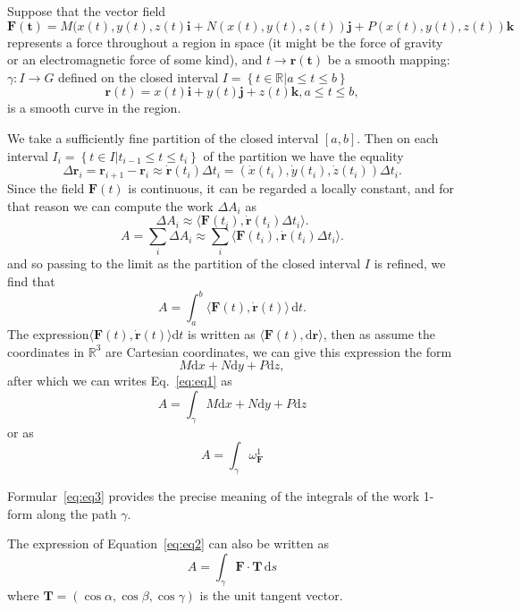 \documentclass[a4paper,12pt]{article}
\begin{document}
\begin{CJK}{UTF8}{gbsn}
Suppose that the vector field 
\[
    \bm{F(t)} = M(x(t),y(t),z(t)\bm{i} + 
N(x(t),y(t),z(t))\bm{j} + P(x(t),y(t),z(t))\bm{k}
\]
represents a force throughout a region in space (it might be the force of 
gravity or an electromagnetic force of some kind), and $t \to \bm{r(t)}$ 
be a smooth mapping: $\gamma: I \to G$ defined on the closed interval 
$I = \left\{t \in \mathbb{R} | a \le t \le b\right\}$
\[
    \bm{r}(t) = x(t)\bm{i} + y(t)\bm{j} + z(t)\bm{k},
    a \le t \le b,
\]
is a smooth curve in the region.

We take a sufficiently fine partition of the closed interval $\left[a,b\right]$.
Then on each interval $\displaystyle I_i = \left\{t \in I | t_{i-1}\le t \le t_i \right\}$
of the partition we have the equality 
\[
    \Delta \bm{r}_i = \bm{r}_{i+1} - \bm{r}_i \approx 
    \dot{\bm{r}}(t_i)\Delta t_i = \left(\dot{x}(t_i),\dot{y}(t_i),\dot{z}(t_i)\right)\Delta t_i.
    \]
Since the field $\bm{F}(t)$ is continuous, it can be regarded a locally 
constant, and for that reason we can compute the work $\Delta A_i$ as 
\[
    \Delta A_i \approx \langle \bm{F}(t_i), \dot{\bm{r}}(t_i)\Delta t_i \rangle.
\]
\[
    A = \sum_{i}\Delta A_i \approx \sum_i \langle \bm{F}(t_i), \dot{\bm{r}}(t_i)\Delta t_i \rangle.
    \]
and so passing to the limit as the partition of the closed interval $I$ is 
refined, we find that 
\begin{equation}
    A = \int_a^b \langle \bm{F}(t), \dot{\bm{r}}(t) \rangle \, 
    \mathrm{d}t.
    \label{eq:eq1}
\end{equation}
The expression$\displaystyle \langle \bm{F}(t), \dot{\bm{r}}(t) \rangle
\mathrm{d}t$ is written as $\displaystyle \langle \bm{F}(t), \mathrm{d}\bm{r}
\rangle $, then as assume the coordinates in $\mathbb{R}^3$ are Cartesian 
coordinates, we can give this expression the form 
\[
    M\mathrm{d}x + N\mathrm{d}y + P\mathrm{d}z,
\]
after which we can writes Eq.~\ref{eq:eq1} as  
\begin{equation}
    A = \int_{\gamma}M\mathrm{d}x + N\mathrm{d}y + P\mathrm{d}z
    \label{eq:eq2}
\end{equation}
or as 
\begin{equation}
    A = \int_{\gamma}\omega_{\bm{F}}^1
    \label{eq:eq3}
\end{equation}

Formular~\ref{eq:eq3} provides the precise meaning of the integrals of the 
work 1-form along the path $\gamma$.

The expression of Equation~\ref{eq:eq2} can also be written as 
\begin{equation}
    A = \int_{\gamma}\bm{F}\cdot{\bm{T}}\,\mathrm{d}s
    \label{eq:eq4}
\end{equation}
where $\bm{T} = \left(\cos \alpha, \cos \beta, \cos \gamma\right)$ is the unit tangent 
vector.


\end{CJK}
\end{document}
